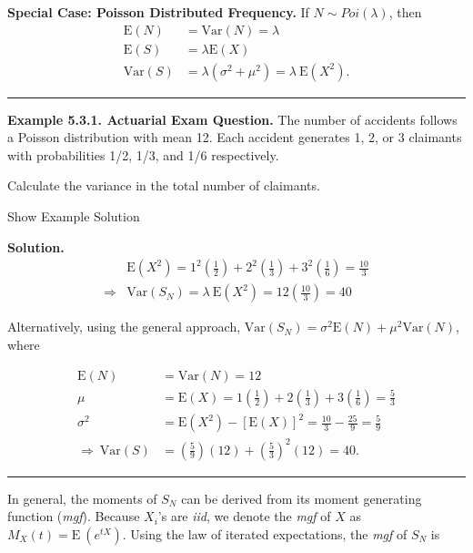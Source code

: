 \documentclass[]{book}
\theoremstyle{definition}
\theoremstyle{definition}
\theoremstyle{definition}
\theoremstyle{remark}
\begin{document}
\textbf{Special Case: Poisson Distributed Frequency.} If
\(N \sim Poi (\lambda)\), then \[\begin{aligned}
\mathrm{E}(N) &= \mathrm{Var}(N) = \lambda\\
\mathrm{E}(S) &= \lambda \mathrm{E}(X)\\
\mathrm{Var}(S) &= \lambda (\sigma^2 + \mu^2) = \lambda ~\mathrm{E} (X^2) .
\end{aligned}\]

\begin{center}\rule{0.5\linewidth}{\linethickness}\end{center}

\textbf{Example 5.3.1. Actuarial Exam Question.} The number of accidents
follows a Poisson distribution with mean 12. Each accident generates 1,
2, or 3 claimants with probabilities 1/2, 1/3, and 1/6 respectively.

Calculate the variance in the total number of claimants.

Show Example Solution

\hypertarget{toggleExampleAggLoss.3.1}{}
\textbf{Solution.} \[\begin{aligned} 
& \mathrm{E}(X^2) = 1^2 \left( \frac{1}{2}\right) + 2^2\left(\frac{1}{3} \right) + 3^2\left(\frac{1}{6}\right)
= \frac{10}{3} \\
\Rightarrow &\mathrm{Var}(S_N) = \lambda \ \mathrm{E}(X^2) = 12\left(\frac{10}{3}\right) = 40
\end{aligned}\]

Alternatively, using the general approach,
\(\mathrm{Var}(S_N) = \sigma^2 \mathrm{E}(N) + \mu^2 \mathrm{Var}(N)\),
where

\[\begin{aligned}
\mathrm{E}(N) &= \mathrm{Var}(N) = 12 \\
\mu &= \mathrm{E}(X) = 1\left(\frac{1}{2}\right) + 2\left(\frac{1}{3}\right) + 3\left(\frac{1}{6}\right)
= \frac{5}{3} \\
\sigma^2 &= \mathrm{E}(X^2) - [\mathrm{E}(X)]^2 = \frac{10}{3} - \frac{25}{9}
= \frac{5}{9} \\
\Rightarrow \ \mathrm{Var}(S) &= \left(\frac{5}{9}\right)\left(12\right) + \left(\frac{5}{3}\right)^2\left(12\right) = 40 .
\end{aligned}\]

\begin{center}\rule{0.5\linewidth}{\linethickness}\end{center}

In general, the moments of \(S_N\) can be derived from its moment
generating function (\emph{mgf}). Because \(X_i\)'s are \emph{iid}, we
denote the \emph{mgf} of \(X\) as \(M_{X}(t) = \mathrm{E~}(e^{tX})\).
Using the law of iterated expectations, the \emph{mgf} of \(S_N\) is
\end{document}
